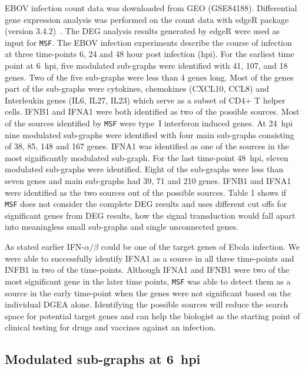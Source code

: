 \documentclass[10pt,a4paper,twocolumn]{article}
\begin{document}
EBOV infection count data was downloaded from GEO (GSE84188). Differential
gene expression analysis was performed on the count data with edgeR package
(version 3.4.2)~\cite{edgeR}. The DEG analysis results generated by edgeR
were used as input for \texttt{MSF}. The EBOV infection experiments
describe the course of infection at three time-points 6, 24 and 48 hour
post infection (hpi). For the earliest time point at 6~hpi, five modulated
sub-graphs were identified with 41, 107, and 18 genes. Two of the five
sub-graphs were less than 4 genes long. Most of the genes part of the
sub-graphs were cytokines, chemokines (CXCL10, CCL8) and Interleukin genes
(IL6, IL27, IL23) which serve as a subset of CD4+ T helper cells. IFNB1 and
IFNA1 were both identified as two of the possible sources. Most of the
sources identified by \texttt{MSF} were type~I interferon induced genes. At
24~hpi nine modulated sub-graphs were identified with four main sub-graphs
consisting of 38, 85, 148 and 167 genes. IFNA1 was identified as one of the
sources in the most significantly modulated sub-graph. For the last
time-point 48~hpi, eleven modulated sub-graphs were identified. Eight of
the sub-graphs were less than seven genes and main sub-graphs had 39, 71
and 210 genes. IFNB1 and IFNA1 were identified as the two sources out of
the possible sources. Table 1 shows if \texttt{MSF} does not consider the complete DEG results and uses different cut offs for significant genes from DEG results, how the signal transduction would fall apart into meaningless small sub-graphs and single unconnected genes.

As stated earlier IFN-$\alpha / \beta$ could be one of the target
genes of Ebola infection. We were able to successfully identify IFNA1
as a source in all three time-points and INFB1 in two of the
time-points. Although IFNA1 and IFNB1 were two of the most significant
gene in the later time points, \texttt{MSF} was able to detect them as
a source in the early time-point when the genes were not significant
based on the individual DGEA alone. Identifying the possible sources will
reduce the search space for potential target genes and can help the
biologist as the starting point of clinical testing for drugs and
vaccines against an infection.



\subsection*{Modulated sub-graphs at 6~hpi}
\end{document}
